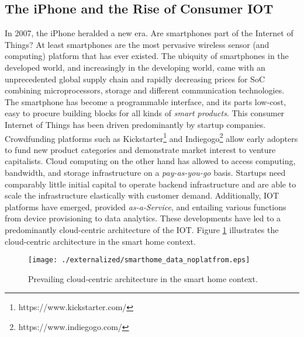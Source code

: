\subsection{The iPhone and the Rise of Consumer IOT}

In 2007, the iPhone heralded a new era. Are smartphones part of the Internet of Things? At least smartphones are the most pervasive wireless sensor (and computing) platform that has ever existed. The ubiquity of smartphones in the developed world, and increasingly in the developing world, came with an unprecedented global supply chain and rapidly decreasing prices for \ac{SoC} combining microprocessors, storage and different communication technologies. The smartphone has become a programmable interface, and its parts low-cost, easy to procure building blocks for all kinds of \emph{smart products}. This consumer Internet of Things has been driven predominantly by startup companies. Crowdfunding platforms such as Kickstarter\footnote{https://www.kickstarter.com/} and Indiegogo\footnote{https://www.indiegogo.com/} allow early adopters to fund new product categories and demonstrate market interest to venture capitalists. Cloud computing on the other hand has allowed to access computing, bandwidth, and storage infrastructure on a \emph{pay-as-you-go} basis. Startups need comparably little initial capital to operate backend infrastructure and are able to scale the infrastructure elastically with customer demand. Additionally, \ac{IOT} platforms have emerged, provided \emph{as-a-Service}, and entailing various functions from device provisioning to data analytics. These developments have led to a predominantly cloud-centric architecture of the \ac{IOT}. Figure \ref{fig:smarthome} illustrates the cloud-centric architecture in the smart home context.


\begin{figure}
\centering
\texttt{[image: ./externalized/smarthome\_data\_noplatfrom.eps]}
\caption{Prevailing cloud-centric architecture in the smart home context.}
\label{fig:smarthome}
\end{figure}




